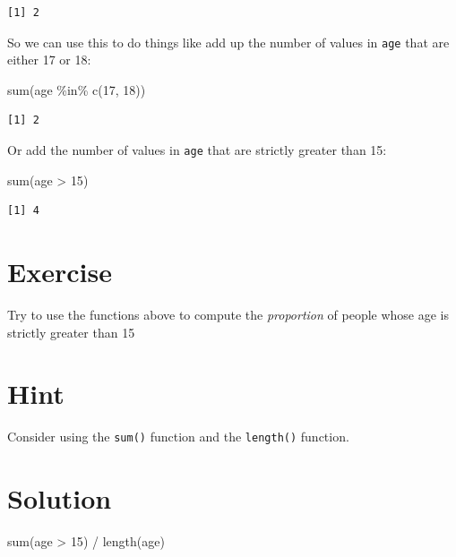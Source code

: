 \documentclass[
  letterpaper,
  DIV=11,
  numbers=noendperiod]{scrreprt}
\newenvironment{Shaded}{\begin{snugshade}}{\end{snugshade}}
\newcommand{\DecValTok}[1]{\textcolor[rgb]{0.68,0.00,0.00}{#1}}
\newcommand{\FunctionTok}[1]{\textcolor[rgb]{0.28,0.35,0.67}{#1}}
\newcommand{\NormalTok}[1]{\textcolor[rgb]{0.00,0.23,0.31}{#1}}
\newcommand{\SpecialCharTok}[1]{\textcolor[rgb]{0.37,0.37,0.37}{#1}}
\begin{document}
\begin{verbatim}
[1] 2
\end{verbatim}

So we can use this to do things like add up the number of values in
\texttt{age} that are either 17 or 18:

\begin{Shaded}
\begin{Highlighting}[]
\FunctionTok{sum}\NormalTok{(age }\SpecialCharTok{\%in\%} \FunctionTok{c}\NormalTok{(}\DecValTok{17}\NormalTok{, }\DecValTok{18}\NormalTok{))}
\end{Highlighting}
\end{Shaded}

\begin{verbatim}
[1] 2
\end{verbatim}

Or add the number of values in \texttt{age} that are strictly greater
than 15:

\begin{Shaded}
\begin{Highlighting}[]
\FunctionTok{sum}\NormalTok{(age }\SpecialCharTok{\textgreater{}} \DecValTok{15}\NormalTok{)}
\end{Highlighting}
\end{Shaded}

\begin{verbatim}
[1] 4
\end{verbatim}

\section{Exercise}

Try to use the functions above to compute the \emph{proportion} of
people whose age is strictly greater than 15

\section{Hint}

Consider using the \texttt{sum()} function and the \texttt{length()}
function.

\section{Solution}

\begin{Shaded}
\begin{Highlighting}[]
\FunctionTok{sum}\NormalTok{(age }\SpecialCharTok{\textgreater{}} \DecValTok{15}\NormalTok{) }\SpecialCharTok{/} \FunctionTok{length}\NormalTok{(age)}
\end{Highlighting}
\end{Shaded}
\end{document}
